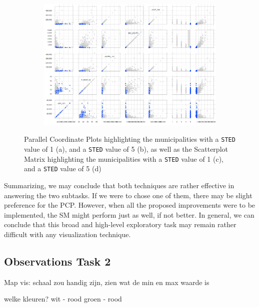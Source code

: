 \begin{figure}[h!]
\begin{subfigure}[t]{0.48\textwidth}
        \caption{ }
    \end{subfigure}
    \begin{subfigure}[t]{0.48\textwidth}
        \includegraphics[width=\textwidth]{img/sm_STED5.png}
        \caption{ }
    \end{subfigure}
    \caption{Parallel Coordinate Plots highlighting the municipalities with a \texttt{STED} value of 1 (a), and a \texttt{STED} value of 5 (b), as well as the Scatterplot Matrix highlighting the municipalities with a \texttt{STED} value of 1 (c), and a \texttt{STED} value of 5 (d)}
    \label{fig:sted}
\end{figure}

Summarizing, we may conclude that both techniques are rather effective in answering the two subtasks. If we were to chose one of them, there may be  slight preference for the PCP. However, when all the proposed improvements were to be implemented, the SM might perform just as well, if not better. In general, we can conclude that this broad and high-level exploratory task may remain rather difficult with any visualization technique.


\subsection{Observations Task 2}
Map vis:
schaal zou handig zijn, zien wat de min en max waarde is

welke kleuren?
wit - rood
groen - rood
